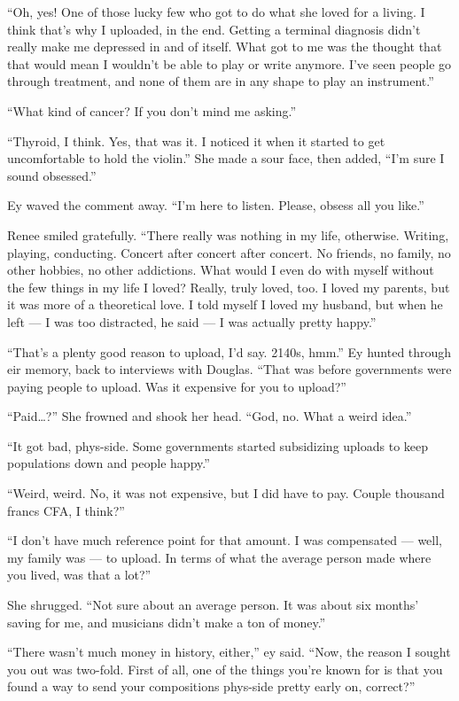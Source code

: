 ``Oh, yes! One of those lucky few who got to do what she loved for a living. I think that's why I uploaded, in the end. Getting a terminal diagnosis didn't really make me depressed in and of itself. What got to me was the thought that that would mean I wouldn't be able to play or write anymore. I've seen people go through treatment, and none of them are in any shape to play an instrument.''

``What kind of cancer? If you don't mind me asking.''

``Thyroid, I think. Yes, that was it. I noticed it when it started to get uncomfortable to hold the violin.'' She made a sour face, then added, ``I'm sure I sound obsessed.''

Ey waved the comment away. ``I'm here to listen. Please, obsess all you like.''

Renee smiled gratefully. ``There really was nothing in my life, otherwise. Writing, playing, conducting. Concert after concert after concert. No friends, no family, no other hobbies, no other addictions. What would I even do with myself without the few things in my life I loved? Really, truly loved, too. I loved my parents, but it was more of a theoretical love. I told myself I loved my husband, but when he left — I was too distracted, he said — I was actually pretty happy.''

``That's a plenty good reason to upload, I'd say. 2140s, hmm.'' Ey hunted through eir memory, back to interviews with Douglas. ``That was before governments were paying people to upload. Was it expensive for you to upload?''

``Paid\ldots?'' She frowned and shook her head. ``God, no. What a weird idea.''

``It got bad, phys-side. Some governments started subsidizing uploads to keep populations down and people happy.''

``Weird, weird. No, it was not expensive, but I did have to pay. Couple thousand francs CFA, I think?''

``I don't have much reference point for that amount. I was compensated — well, my family was — to upload. In terms of what the average person made where you lived, was that a lot?''

She shrugged. ``Not sure about an average person. It was about six months' saving for me, and musicians didn't make a ton of money.''

``There wasn't much money in history, either,'' ey said. ``Now, the reason I sought you out was two-fold. First of all, one of the things you're known for is that you found a way to send your compositions phys-side pretty early on, correct?''

